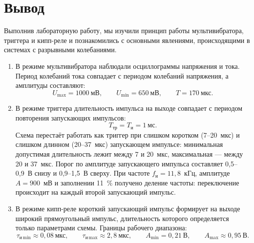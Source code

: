 \section{Вывод}

Выполнив лабораторную работу, мы изучили принцип работы мультивибратора, триггера и кипп-реле и познакомились с основными явлениями, происходящими в системах с разрывными колебаниями.

\begin{enumerate}
	\item В режиме мультивибратора наблюдали осциллограммы напряжения и тока. Период колебаний тока совпадает с периодом колебаний напряжения, а амплитуды составляют:
	\[
	U_{\max} = 1000~\text{мВ}, \qquad U_{\min} = 650~\text{мВ}, \qquad T = 170~\text{мкс}.
	\]
	\item В режиме триггера длительность импульса на выходе совпадает с периодом повторения запускающих импульсов:
	\[
	T_\text{тр} = T_\text{и} = 1~\text{мс}.
	\]
	Схема перестаёт работать как триггер при слишком коротком (7--20~мкс) и слишком длинном (20--37~мкс) запускающем импульсе: минимальная допустимая длительность лежит между 7 и 20~мкс, максимальная --- между 20 и 37~мкс. Порог по амплитуде запускающего импульса составляет 0,5--0,9~В снизу и 0,9--1,5~В сверху. При частоте $f_\text{и} = 11{,}8$~кГц, амплитуде $A = 900$~мВ и заполнении 11~\% получено деление частоты: переключение происходит на каждый второй запускающий импульс.
	\item В режиме кипп-реле короткий запускающий импульс формирует на выходе широкий прямоугольный импульс, длительность которого определяется только параметрами схемы. Границы рабочего диапазона:
	\[
	\tau_{\text{и}\,\min} \approx 0{,}08~\text{мкс}, \qquad \tau_{\text{и}\,\max} \approx 2{,}8~\text{мкс}, \qquad A_{\min} = 0{,}21~\text{В}, \qquad A_{\max} \approx 0{,}95~\text{В}.
	\]
\end{enumerate}
